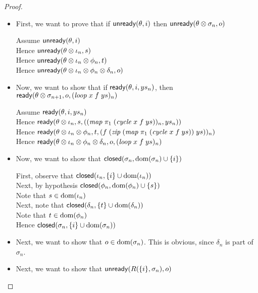\begin{proof}
  \begin{itemize}
  \item First, we want to prove that if $\mathsf{unready}({\theta}, {i})$ then $\mathsf{unready}({\theta \otimes \sigma_n}, {o})$ 

    \begin{tabbedproof}
      \oo Assume $\mathsf{unready}({\theta}, {i})$ \\
      \oo Hence $\mathsf{unready}({\theta \otimes \iota_n}, {s})$ \\
      \oo Hence $\mathsf{unready}({\theta \otimes \iota_n \otimes \phi_n}, {t})$ \\
      \oo Hence $\mathsf{unready}({\theta \otimes \iota_n \otimes \phi_n \otimes \delta_n}, {o})$ \\
    \end{tabbedproof}

  \item Now, we want to show that if $\mathsf{ready}({\theta}, {i}, {ys_n})$, then $\mathsf{ready}({\theta \otimes \sigma_{n+1}}, {o}, {(\mathit{loop}\;x\;f\;ys)_n})$ 
    \begin{tabbedproof}
      \oo Assume $\mathsf{ready}({\theta}, {i}, {ys_n})$ \\
      \oo Hence $\mathsf{ready}({\theta \otimes \iota_n}, {s}, {((\mathit{map}\;\pi_1\;(\mathit{cycle}\;x\;f\;ys))_n, ys_n)})$ \\
      \oo Hence $\mathsf{ready}({\theta \otimes \iota_n \otimes \phi_n}, {t}, {(f\;(\mathit{zip}\;(\mathit{map}\;\pi_1\;(\mathit{cycle}\;x\;f\;ys))\;ys))_n})$ \\
      \oo Hence $\mathsf{ready}({\theta \otimes \iota_n \otimes \phi_n \otimes \delta_n}, {o}, {(\mathit{loop}\;x\;f\;ys)_n})$ \\
    \end{tabbedproof}

  \item Now, we want to show that $\mathsf{closed}({\sigma_n}, {\mbox{dom}({\sigma_n}) \cup \{{i}\}})$ 

    \begin{tabbedproof}
      \oo First, observe that $\mathsf{closed}({\iota_n}, {\{{i}\} \cup \mbox{dom}({\iota_n})})$\\
      \oo Next, by hypothesis $\mathsf{closed}({\phi_n}, {\mbox{dom}({\phi_n}) \cup \{{s}\}})$ \\
      \oo Note that $s \in \mbox{dom}({\iota_n})$ \\
      \oo Next, note that $\mathsf{closed}({\delta_n}, {\{{t}\} \cup \mbox{dom}({\delta_n})})$ \\
      \oo Note that $t \in \mbox{dom}({\phi_n})$ \\
      \oo Hence $\mathsf{closed}({\sigma_n}, {\{{i}\} \cup \mbox{dom}({\sigma_n})})$
    \end{tabbedproof}
  \item Next, we want to show that $o \in \mbox{dom}({\sigma_n})$. This is obvious, since $\delta_n$ is part 
    of $\sigma_n$. 
  \item Next, we want to show that $\mathsf{unready}({R(\{{i}\}, \sigma_n)}, {o})$
    

\end{itemize}
\end{proof}
